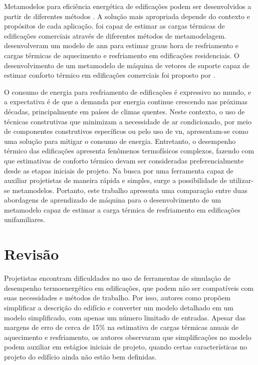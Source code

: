 \documentclass{article}
\begin{document}
Metamodelos para eficiência energética de edificações podem ser desenvolvidos a partir de diferentes métodos \citep{Ostergard2018}. A solução mais apropriada depende do contexto e propósitos de cada aplicação.
\citet{Versage2015} foi capaz de estimar as cargas térmicas de edificações comerciais através de diferentes métodos de metamodelagem.
\citet{Melo2016} desenvolveram um modelo de \acrlong{ann} para estimar graus hora de resfriamento e cargas térmicas de aquecimento e resfriamento em edificações residenciais.
O desenvolvimento de um metamodelo de máquina de vetores de suporte capaz de estimar conforto térmico em edificações comerciais foi proposto por \citet{Rackes2016}. 

O consumo de energia para resfriamento de edificações é expressivo no mundo, e a expectativa é de que a demanda por energia continue crescendo nas próximas décadas, principalmente em países de climas quentes.
Neste contexto, o uso de técnicas construtivas que minimizam a necessidade de ar condicionado, por meio de componentes construtivos específicos ou pelo uso de \acrlong{vn}, apresentam-se como uma solução para mitigar o consumo de energia.
Entretanto, o desempenho térmico das edificações apresenta fenômenos termofísicos complexos, fazendo com que estimativas de conforto térmico devam ser consideradas preferencialmente desde as etapas iniciais de projeto. 	
Na busca por uma ferramenta capaz de auxiliar projetistas de maneira rápida e simples, surge a possibilidade de utilizar-se metamodelos.
Portanto, este trabalho apresenta uma comparação entre duas abordagens de aprendizado de máquina para o desenvolvimento de um metamodelo capaz de estimar a carga térmica de resfriamento em edificações unifamiliares.

\section{Revisão}

Projetistas encontram dificuldades no uso de ferramentas de simulação de desempenho termoenergético em edificações, que podem não ser compatíveis com suas necessidades e métodos de trabalho. Por isso, autores como \citet{Picco2014a} propõem simplificar a descrição do edifício e converter um modelo detalhado em um modelo simplificado, com apenas um número limitado de entradas. Apesar das margens de erro de cerca de 15\% na estimativa de cargas térmicas anuais de aquecimento e resfriamento, os autores observaram que simplificações no modelo podem auxiliar em estágios iniciais de projeto, quando certas características no projeto do edifício ainda não estão bem definidas.
\end{document}
